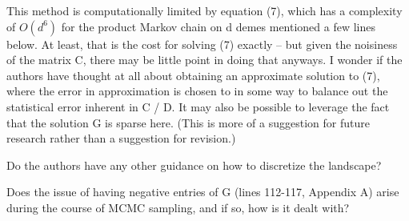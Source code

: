 
\begin{point}{}
    This method is computationally limited by equation (7), which has a
    complexity of $O(d^6)$ for the product Markov chain on d demes mentioned a
    few lines below. At least, that is the cost for solving (7) exactly -- but
    given the noisiness of the matrix C, there may be little point in doing
    that anyways. I wonder if the authors have thought at all about obtaining
    an approximate solution to (7), where the error in approximation is chosen
    to in some way to balance out the statistical error inherent in C / D. It
    may also be possible to leverage the fact that the solution G is sparse
    here.  (This is more of a suggestion for future research rather than a
    suggestion for revision.)
\end{point}


\begin{point}{\revref}
     Do the authors have any other guidance on how to discretize the landscape?
\end{point}


\begin{point}{}
    Does the issue of having negative entries of G (lines 112-117, Appendix A)
    arise during the course of MCMC sampling, and if so, how is it dealt with?
\end{point}

